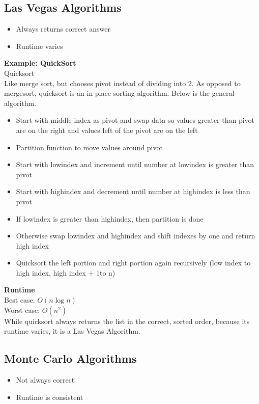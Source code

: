 \documentclass{article}
\begin{document}
\begin{spacing}{1.5}
\subsection{Las Vegas Algorithms}
\label{sec:vegas}
\begin{itemize}
    \item Always returns correct answer
    \item Runtime varies
\end{itemize}
\textbf{Example: QuickSort}\\
Quicksort\\
Like merge sort, but chooses pivot instead of dividing into 2. As opposed to mergesort, quicksort is an in-place sorting algorithm. Below is the general algorithm.\\
\begin{spacing}{1}
\begin{itemize}
    \item Start with middle index as pivot and swap data so values greater than pivot are on the right and values left of the pivot are on the left\\
    \item Partition function to move values around pivot\\
    \item Start with lowindex and increment until number at lowindex is greater than pivot\\
    \item Start with highindex and decrement until number at highindex is less than pivot\\
    \item If lowindex is greater than highindex, then partition is done\\
    \item Otherwise swap lowindex and highindex and shift indexes by one and return high index\\
    \item Quicksort the left portion and right portion again recursively (low index to high index, high index + 1to n)\\
\end{itemize}
\end{spacing}
\textbf{Runtime}\\
Best case: $O(n \log n)$\\
Worst case: $O(n^2)$\\
While quicksort always returns the list in the correct, sorted order, because its runtime varies, it is a Las Vegas Algorithm.\\

\subsection{Monte Carlo Algorithms}
\label{sec:montecarlo}
\begin{itemize}
    \item Not always correct
    \item Runtime is consistent
\end{itemize}
\end{spacing}
\end{document}
